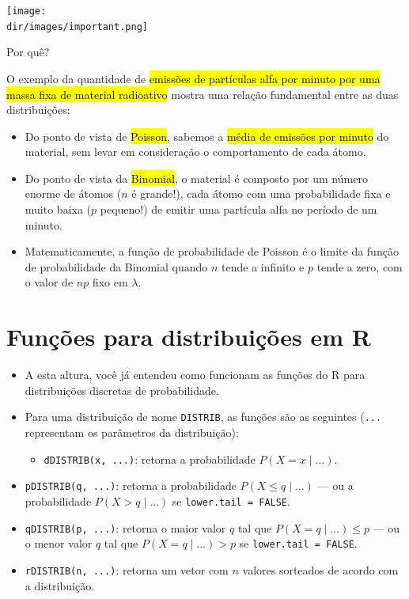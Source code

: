 \documentclass[
  11pt]{report}
\providecommand{\tightlist}{%
  \setlength{\itemsep}{0pt}\setlength{\parskip}{0pt}}
\newcommand{\dir}{/ssd/R/x86_64-pc-linux-gnu-library/4.3/fnaufelRmd/rmarkdown/resources}
\newenvironment{rmdimportant}
{
  \begin{myimportant}
    \texttt{[image: \\dir/images/important.png]}
    \tcblower
  }
  {
  \end{myimportant}
}
\begin{document}
\begin{rmdimportant}

Por quê?

O exemplo da quantidade de {\hl{emissões de partículas alfa por minuto por uma massa fixa de material radioativo}} mostra uma relação fundamental entre as duas distribuições:

\begin{itemize}
\item
  Do ponto de vista de {\hl{Poisson}}, sabemos a {\hl{média de emissões por minuto}} do material, sem levar em consideração o comportamento de cada átomo.
\item
  Do ponto de vista da {\hl{Binomial}}, o material é composto por um número enorme de átomos ($n$ é grande!), cada átomo com uma probabilidade fixa e muito baixa ($p$ pequeno!) de emitir uma partícula alfa no período de um minuto.
\item
  Matematicamente, a função de probabilidade de Poisson é o limite da função de probabilidade da Binomial quando $n$ tende a infinito e $p$ tende a zero, com o valor de $np$ fixo em $\lambda$.
\end{itemize}

\end{rmdimportant}

\hypertarget{funuxe7uxf5es-para-distribuiuxe7uxf5es-em-r}{%
\section{Funções para distribuições em R}\label{funuxe7uxf5es-para-distribuiuxe7uxf5es-em-r}}

\begin{itemize}
\item
  A esta altura, você já entendeu como funcionam as funções do R para distribuições discretas de probabilidade.
\item
  Para uma distribuição de nome \texttt{DISTRIB}, as funções são as seguintes (\texttt{...} representam os parâmetros da distribuição):

  \begin{itemize}
  \tightlist
  \item
    \texttt{dDISTRIB(x,\ ...)}: retorna a probabilidade $P(X = x \mid \dots)$.
  \end{itemize}
\item
  \texttt{pDISTRIB(q,\ ...)}: retorna a probabilidade $P(X \leq q \mid \dots)$ --- ou a probabilidade $P(X > q \mid \dots)$ se \texttt{lower.tail\ =\ FALSE}.
\item
  \texttt{qDISTRIB(p,\ ...)}: retorna o maior valor $q$ tal que $P(X = q \mid \dots) \leq p$ --- ou o menor valor $q$ tal que $P(X = q \mid \dots) > p$ se \texttt{lower.tail\ =\ FALSE}.
\item
  \texttt{rDISTRIB(n,\ ...)}: retorna um vetor com $n$ valores sorteados de acordo com a distribuição.
\end{itemize}
\end{document}
